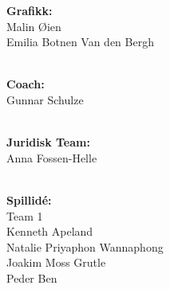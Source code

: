 \documentclass[paper=a4]{article}
\begin{document}
\begin{center}
\textbf{Grafikk:} \\
Malin Øien \\
Emilia Botnen Van den Bergh \\ \

\textbf{Coach:} \\
Gunnar Schulze \\ \ 

\textbf{Juridisk Team:} \\ 
Anna Fossen-Helle \\ \

\textbf{Spillidé:} \\
Team 1 \\
Kenneth Apeland \\
Natalie Priyaphon Wannaphong \\
Joakim Moss Grutle \\
Peder Ben \\ \
\end{center}
\end{document}
